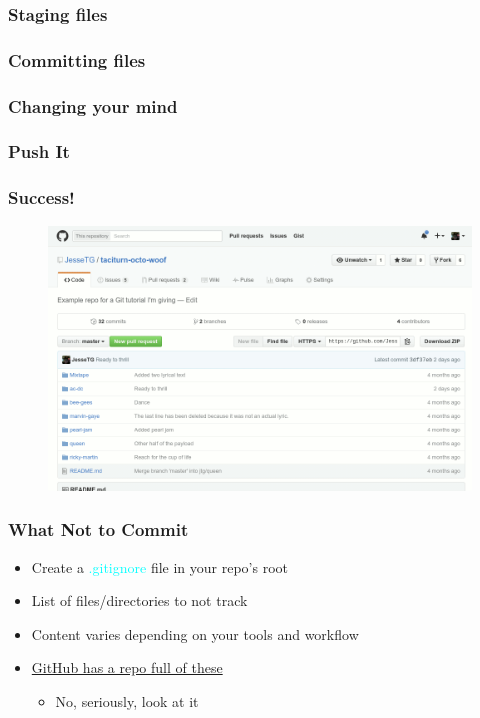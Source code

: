 \documentclass[glossy]{beamer}
\begin{document}
\begin{frame}[fragile=singleslide]
  \frametitle{Staging files}

\end{frame}

\begin{frame}[fragile=singleslide]
  \frametitle{Committing files}

\end{frame}

\begin{frame}[fragile=singleslide]
  \frametitle{Changing your mind}

\end{frame}

\begin{frame}[fragile=singleslide]
  \frametitle{Push It}

\end{frame}

\begin{frame}[fragile=singleslide]
  \frametitle{Success!}

  \begin{figure}
    \centering
    \includegraphics[width=0.9\columnwidth]{img/push-success}
  \end{figure}
\end{frame}

\begin{frame}[fragile=singleslide]
  \frametitle{What Not to Commit}

  \begin{itemize}
    \item Create a \textcolor{cyan}{.gitignore} file in your repo's root
    \item List of files/directories to not track
    \item Content varies depending on your tools and workflow
    \item \href{https://github.com/github/gitignore}{GitHub has a repo full of these}
    \begin{itemize}
      \item No, seriously, look at it
    \end{itemize}
  \end{itemize}

\end{frame}
\end{document}
